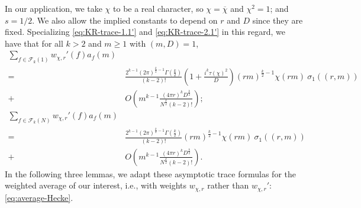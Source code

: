 \documentclass[12pt, reqno,oneside]{amsart}
\theoremstyle{plain}
\theoremstyle{definition}
\theoremstyle{remark}
\theoremstyle{plain}
\numberwithin{equation}{section}
\begin{document}
In our application, we take $\chi$ to be a real character, so $\chi = \overline{\chi}$ and $\chi^2 = 1$; and $s = 1/2$. We also allow the implied constants to depend on $r$ and $D$ since they are fixed. Specializing \eqref{eq:KR-trace-1.1'} and \eqref{eq:KR-trace-2.1'} in this regard, we have that for all $k>2$ and $m\geq1$ with $(m,D)=1$,
\begin{align}\nonumber
\sum_{f\in\mathcal{F}_k(1)}w_{\chi,r}'(f)a_f(m)& \\
\nonumber 
= \ & \frac{2^{k-1}(2\pi)^{\frac{k}{2}-1}\Gamma\left(\frac{k}{2}\right)}{(k-2)!}\left(1+\frac{i^k\tau(\chi)^2}{D}\right)(rm)^{\frac{k}{2}-1}\chi(rm) \ \sigma_1((r,m))\\
\label{eq:KR-trace-1.1}
+ \ & O\left(m^{k-1}\frac{(4\pi r)^{k}D^{\frac{k}{2}}}{N^{\frac{k}{2}}(k-2)!}\right); \\
\nonumber
\sum_{f\in\mathcal{F}_k(N)}w_{\chi,r}'(f)a_f(m)& \\
\nonumber 
= \ & \frac{2^{k-1}(2\pi)^{\frac{k}{2}-1}\Gamma\left(\frac{k}{2}\right)}{(k-2)!}(rm)^{\frac{k}{2}-1}\chi(rm) \ \sigma_1((r,m))\\
\label{eq:KR-trace-2.1}
+ \ & O\left(m^{k-1}\frac{(4\pi r)^{k}D^{\frac{k}{2}}}{N^{\frac{k}{2}}(k-2)!}\right).
\end{align}
In the following three lemmas, we adapt these asymptotic trace formulas for the weighted average of our interest, i.e., with weights $w_{\chi,r}$ rather than $w_{\chi,r}'$: \eqref{eq:average-Hecke}. 
\end{document}
